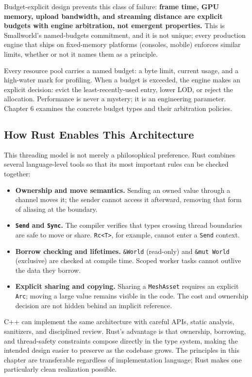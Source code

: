 \documentclass[
  11pt,
  letterpaper,
  DIV=11,
  numbers=noendperiod,
  twoside,
  open=right]{scrreprt}
\begin{document}
Budget-explicit design prevents this class of failure: \textbf{frame
time, GPU memory, upload bandwidth, and streaming distance are explicit
budgets with engine arbitration, not emergent properties.} This is
Smallworld's named-budgets commitment, and it is not unique; every
production engine that ships on fixed-memory platforms (consoles,
mobile) enforces similar limits, whether or not it names them as a
principle.

Every resource pool carries a named budget: a byte limit, current usage,
and a high-water mark for profiling. When a budget is exceeded, the
engine makes an explicit decision: evict the least-recently-used entry,
lower LOD, or reject the allocation. Performance is never a mystery; it
is an engineering parameter. Chapter 6 examines the concrete budget
types and their arbitration policies.

\subsection{How Rust Enables This
Architecture}\label{how-rust-enables-this-architecture}

This threading model is not merely a philosophical preference. Rust
combines several language-level tools so that its most important rules
can be checked together:

\begin{itemize}
\item
  \textbf{Ownership and move semantics.} Sending an owned value through
  a channel moves it; the sender cannot access it afterward, removing
  that form of aliasing at the boundary.
\item
  \textbf{\texttt{Send} and \texttt{Sync}.} The compiler verifies that
  types crossing thread boundaries are safe to move or share.
  \texttt{Rc\textless{}T\textgreater{}}, for example, cannot enter a
  \texttt{Send} context.
\item
  \textbf{Borrow checking and lifetimes.} \texttt{\&World} (read-only)
  and \texttt{\&mut\ World} (exclusive) are checked at compile time.
  Scoped worker tasks cannot outlive the data they borrow.
\item
  \textbf{Explicit sharing and copying.} Sharing a \texttt{MeshAsset}
  requires an explicit \texttt{Arc}; moving a large value remains
  visible in the code. The cost and ownership decision are not hidden
  behind an implicit reference.
\end{itemize}

C++ can implement the same architecture with careful APIs, static
analysis, sanitizers, and disciplined review. Rust's advantage is that
ownership, borrowing, and thread-safety constraints compose directly in
the type system, making the intended design easier to preserve as the
codebase grows. The principles in this chapter are transferable
regardless of implementation language; Rust makes one particularly clean
realization possible.
\end{document}

